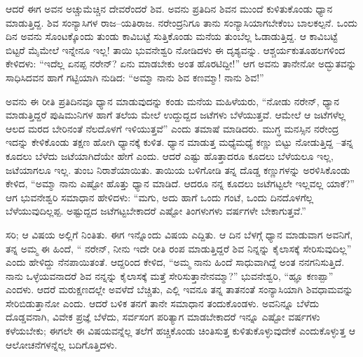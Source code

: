 ಆದರೆ ಈಗ ಅವನ ಅಚ್ಚುಮೆಚ್ಚಿನ ದೇವರೆಂದರೆ ಶಿವ. ಅವನು ಪ್ರತಿದಿನ ಶಿವನ ಮುಂದೆ ಕುಳಿತುಕೊಂಡು ಧ್ಯಾನ ಮಾಡುತ್ತಿದ್ದ. ಶಿವ ಸಂನ್ಯಾಸಿಗಳ ರಾಜ–ಯತಿರಾಜ. ನರೇಂದ್ರನಿಗೂ ತಾನು ಸಂನ್ಯಾಸಿಯಾಗಬೇಕೆಂಬ ಬಾಲಕಲ್ಪನೆ. ಒಂದು ದಿನ ಅವನು ಸೊಂಟಕ್ಕೊಂದು ತುಂಡು ಕಾವಿಬಟ್ಟೆ ಸುತ್ತಿಕೊಂಡು ಮನೆಯ ತುಂಬೆಲ್ಲ ಓಡಾಡುತ್ತಿದ್ದ. ಆ ಕಾವಿಬಟ್ಟೆ ಬಿಟ್ಟರೆ ಮೈಮೇಲೆ ಇನ್ನೇನೂ ಇಲ್ಲ! ತಾಯಿ ಭುವನೇಶ್ವರಿ ನೋಡಿದಳು ಈ ದೃಶ್ಯವನ್ನು. ಆಶ್ಚರ್ಯಕುತೂಹಲಗಳಿಂದ ಕೇಳಿದಳು: “ಇದೆಲ್ಲ ಏನಪ್ಪ ನರೇನ್? ಏನು ಮಾಡಬೇಕು ಅಂತ ಹೊರಟಿದ್ದೀ!” ಆಗ ಅವನು ತಾನೇನೋ ಅದ್ಭುತವನ್ನು ಸಾಧಿಸಿದವನ ಹಾಗೆ ಗಟ್ಟಿಯಾಗಿ ನುಡಿದ: “ಅಮ್ಮಾ ನಾನು ಶಿವ ಕಣಮ್ಮಾ! ನಾನು ಶಿವ!”

ಅವನು ಈ ರೀತಿ ಪ್ರತಿದಿನವೂ ಧ್ಯಾನ ಮಾಡುವುದನ್ನು ಕಂಡು ಮನೆಯ ಮಹಿಳೆಯರು, “ನೋಡು ನರೇನ್, ಧ್ಯಾನ ಮಾಡುತ್ತಿದ್ದರೆ ಪುಷಿಮುನಿಗಳ ಹಾಗೆ ತಲೆಯ ಮೇಲೆ ಉದ್ದುದ್ದದ ಜಟೆಗಳು ಬೆಳೆಯುತ್ತವೆ. ಆಮೇಲೆ ಆ ಜಟೆಗಳೆಲ್ಲ ಆಲದ ಮರದ ಬೇರಿನಂತೆ ನೆಲದೊಳಗೆ ಇಳಿಯುತ್ತವೆ” ಎಂದು ತಮಾಷೆ ಮಾಡಿದರು. ಮುಗ್ಧ ಮನಸ್ಸಿನ ನರೇಂದ್ರ ಇದನ್ನು ಕೇಳಿಕೊಂಡು ತಕ್ಷಣ ಹೋಗಿ ಧ್ಯಾನಕ್ಕೆ ಕುಳಿತ. ಧ್ಯಾನ ಮಾಡುತ್ತ ಮಧ್ಯೆಮಧ್ಯೆ ಕಣ್ಣು ಬಿಟ್ಟು ನೋಡುತ್ತಿದ್ದ –ತನ್ನ ಕೂದಲು ಬೆಳೆದು ಜಟೆಯಾಗಿದೆಯೇ ಹೇಗೆ ಎಂದು. ಆದರೆ ಎಷ್ಟು ಹೊತ್ತಾದರೂ ಕೂದಲು ಬೆಳೆಯಲೂ ಇಲ್ಲ, ಜಟೆಯಾಗಲೂ ಇಲ್ಲ. ತುಂಬ ನಿರಾಶೆಯಾಯಿತು. ತಾಯಿಯ ಬಳಿಗೋಡಿ ತನ್ನ ದೊಡ್ಡ ಕಣ್ಣುಗಳನ್ನು ಅರಳಿಸಿಕೊಂಡು ಕೇಳಿದ, “ಅಮ್ಮಾ ನಾನು ಎಷ್ಟೋ ಹೊತ್ತು ಧ್ಯಾನ ಮಾಡಿದೆ. ಆದರೂ ನನ್ನ ಕೂದಲು ಜಟೆಗಟ್ಟಲೇ ಇಲ್ಲವಲ್ಲ ಯಾಕೆ?” ಆಗ ಭುವನೇಶ್ವರಿ ಸಮಾಧಾನ ಹೇಳಿದಳು: “ಮಗು, ಅದು ಹಾಗೆ ಒಂದು ಗಂಟೆ, ಒಂದು ದಿನದೊಳಗೆಲ್ಲ ಬೆಳೆಯುವುದಿಲ್ಲಪ್ಪ. ಅಷ್ಟುದ್ದದ ಜಟೆಗಟ್ಟಬೇಕಾದರೆ ಎಷ್ಟೋ ತಿಂಗಳುಗಳು ವರ್ಷಗಳೇ ಬೇಕಾಗುತ್ತವೆ.”

ಸರಿ; ಆ ವಿಷಯ ಅಲ್ಲಿಗೆ ನಿಂತಿತು. ಈಗ ಇನ್ನೊಂದು ವಿಷಯ ಎದ್ದಿತು. ಆ ದಿನ ಬೆಳಗ್ಗೆ ಧ್ಯಾನ ಮಾಡುವಾಗ ಅವನಿಗೆ, ತನ್ನ ಅಮ್ಮ ಈ ಹಿಂದೆ, “ ನರೇನ್, ನೀನು ಇದೇ ರೀತಿ ರಂಪ ಮಾಡುತ್ತಿದ್ದರೆ ಶಿವ ನಿನ್ನನ್ನು ಕೈಲಾಸಕ್ಕೆ ಸೇರಿಸುವುದಿಲ್ಲ” ಎಂದು ಹೇಳಿದ್ದು ನೆನಪಾಯಿತಂತೆ. ಆದ್ದರಿಂದ ಕೇಳಿದ, “ಅಮ್ಮ ನಾನು ಹಿಂದೆ ಸಾಧುವಾಗಿದ್ದೆ ಅಂತ ನನಗನಿಸುತ್ತಿದೆ. ನಾನು ಒಳ್ಳೆಯವನಾದರೆ ಶಿವ ನನ್ನನ್ನು ಕೈಲಾಸಕ್ಕೆ ಮತ್ತೆ ಸೇರಿಸುತ್ತಾನೇನಮ್ಮಾ?” ಭುವನೇಶ್ವರಿ, “ಹ್ಞೂ ಕಣಪ್ಪಾ” ಎಂದಳು. ಆದರೆ ಮರುಕ್ಷಣದಲ್ಲೇ ಅವಳೆದೆ ಬೆಚ್ಚಿತು, ಎಲ್ಲಿ ಇವನೂ ತನ್ನ ತಾತನಂತೆ ಸಂನ್ಯಾಸಿಯಾಗಿ ಶಿವಧಾಮವನ್ನು ಸೇರಿಬಿಡುತ್ತಾನೋ ಎಂದು. ಆದರೆ ಬಳಿಕ ತನಗೆ ತಾನೇ ಸಮಾಧಾನ ತಂದುಕೊಂಡಳು. ಅವನಿನ್ನೂ ಬೆಳೆದು ದೊಡ್ಡವನಾಗಿ, ವಿವೇಕ ಪ್ರಜ್ಞೆ ಬೆಳೆದು, ಸರ್ವಸಂಗ ಪರಿತ್ಯಾಗ ಮಾಡಬೇಕಾದರೆ ಇನ್ನೂ ಎಷ್ಟೋ ವರ್ಷಗಳು ಕಳೆಯಬೇಕು; ಈಗಲೇ ಈ ವಿಷಯವನ್ನೆಲ್ಲ ತಲೆಗೆ ಹಚ್ಚಿಕೊಂಡು ಚಿಂತಿಸುತ್ತ ಕುಳಿತುಕೊಳ್ಳುವುದೇಕೆ ಎಂದುಕೊಳ್ಳುತ್ತ ಆ ಆಲೋಚನೆಗಳನ್ನೆಲ್ಲ ಬದಿಗೊತ್ತಿದಳು.

